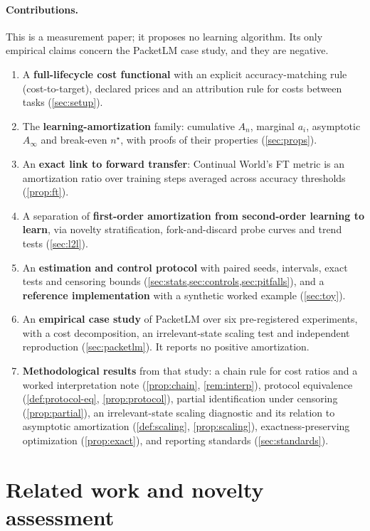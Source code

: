 \documentclass[11pt]{article}
\theoremstyle{remark}
\begin{document}
\paragraph{Contributions.}
This is a measurement paper; it proposes no learning algorithm. Its only empirical claims concern the PacketLM case study, and they are negative.
\begin{enumerate}[leftmargin=*,itemsep=1pt]
\item A \textbf{full-lifecycle cost functional} with an explicit accuracy-matching rule (cost-to-target), declared prices and an attribution rule for costs between tasks (\cref{sec:setup}).
\item The \textbf{learning-amortization} family: cumulative $A_n$, marginal $a_i$, asymptotic $A_\infty$ and break-even $n^\star$, with proofs of their properties (\cref{sec:props}).
\item An \textbf{exact link to forward transfer}: Continual World's FT metric is an amortization ratio over training steps averaged across accuracy thresholds (\cref{prop:ft}).
\item A separation of \textbf{first-order amortization from second-order learning to learn}, via novelty stratification, fork-and-discard probe curves and trend tests (\cref{sec:l2l}).
\item An \textbf{estimation and control protocol} with paired seeds, intervals, exact tests and censoring bounds (\cref{sec:stats,sec:controls,sec:pitfalls}), and a \textbf{reference implementation} with a synthetic worked example (\cref{sec:toy}).
\item An \textbf{empirical case study} of PacketLM over six pre-registered experiments, with a cost decomposition, an irrelevant-state scaling test and independent reproduction (\cref{sec:packetlm}). It reports no positive amortization.
\item \textbf{Methodological results} from that study: a chain rule for cost ratios and a worked interpretation note (\cref{prop:chain}, \cref{rem:interp}), protocol equivalence (\cref{def:protocol-eq}, \cref{prop:protocol}), partial identification under censoring (\cref{prop:partial}), an irrelevant-state scaling diagnostic and its relation to asymptotic amortization (\cref{def:scaling}, \cref{prop:scaling}), exactness-preserving optimization (\cref{prop:exact}), and reporting standards (\cref{sec:standards}).
\end{enumerate}

\section{Related work and novelty assessment}\label{sec:related}
\end{document}
